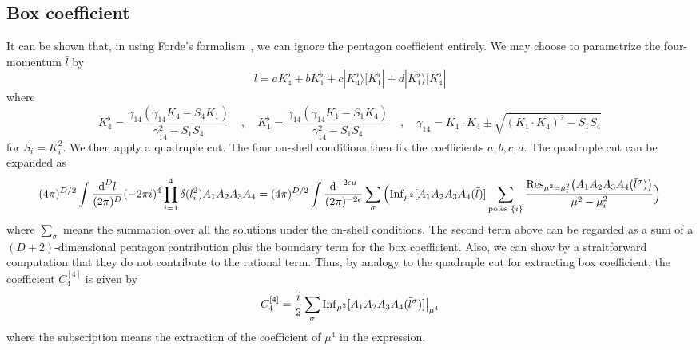 \subsection{Box coefficient}
It can be shown that, in using Forde's formalism~\cite{Forde:2007mi}, we can ignore the pentagon coefficient entirely.
We may choose to parametrize the four-momentum $\bar{l}$ by
\begin{equation*}
\bar{l} = a K_4^\flat + bK_1^\flat + c|K_4^\flat\rangle [K_1^\flat| + d|K_1^\flat\rangle[K_4^\flat|
\end{equation*}
where
\begin{equation}\label{param_rat_box}
K_4^\flat = \frac{\gamma_{14}(\gamma_{14}K_4 - S_4K_1)}{\gamma_{14}^2 - S_1S_4}
\quad,\quad
K_1^\flat = \frac{\gamma_{14}(\gamma_{14}K_1 - S_1K_4)}{\gamma_{14}^2 - S_1S_4}
\quad,\quad
\gamma_{14} = K_1\cdot K_4\pm\sqrt{(K_1\cdot K_4)^2 - S_1 S_4}
\end{equation}
for $S_i = K_i^2$.
We then apply a quadruple cut.
The four on-shell conditions then fix the coefficients $a,b,c,d$.
The quadruple cut can be expanded as
\begin{equation*}
(4\pi)^{D/2}\int\frac{\textrm{d}^D l}{(2\pi)^D}(-2\pi i)^4\prod^4_{i=1}\delta(l_i^2)A_1A_2A_3A_4
= (4\pi)^{D/2}\int\frac{\textrm{d}^{-2\epsilon \mu}}{(2\pi)^{-2\epsilon}}
\sum_{\sigma}\Big(\mathrm{Inf}_{\mu^2}[A_1 A_2 A_3 A_4(\bar{l})] 
\sum_{\textrm{poles $\{i\}$}}\frac{\mathrm{Res}_{\mu^2 = \mu_i^2}\big(A_1A_2A_3A_4(\bar{l}^\sigma)\big)}{\mu^2 - \mu_i^2}\Big)
\end{equation*}
where $\sum_\sigma$ means the summation over all the solutions under the on-shell conditions. 
The second term above can be regarded as a sum of a $(D + 2)$-dimensional pentagon contribution plus the boundary term for the box coefficient.
Also, we can show by a straitforward computation that they do not contribute to the rational term. 
Thus, by analogy to the quadruple cut for extracting box coefficient, the coefficient $C_4^{[4]}$ is given by
\begin{equation*}
C_4^{[4]} = \frac{i}{2}\sum_{\sigma}\mathrm{Inf}_{\mu^2}[A_1A_2A_3A_4(\bar{l}^\sigma)]\big|_{\mu^4}
\end{equation*}
where the subscription means the extraction of the coefficient of $\mu^4$ in the expression.
%
%
